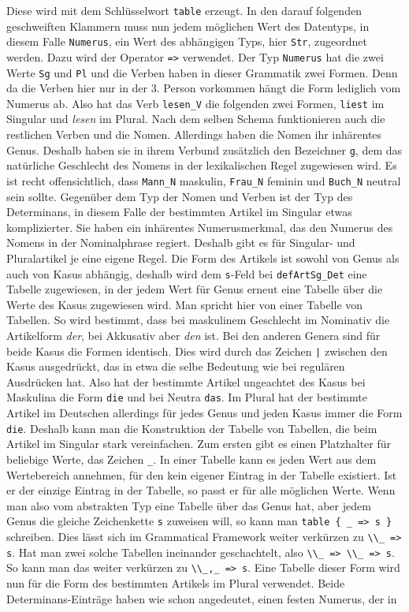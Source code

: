 \documentclass[fontsize=12pt,abstract=on,titlepage,bibliography=totoc,ngerman,listof=totoc]{scrreprt}
\begin{document}
Diese wird mit dem Schlüsselwort \texttt{table} erzeugt. In den darauf folgenden geschweiften Klammern muss nun jedem möglichen Wert des Datentyps, in diesem Falle \texttt{Numerus}, ein Wert des abhängigen Typs, hier \texttt{Str}, zugeordnet werden. Dazu wird der Operator \texttt{=>} verwendet. Der Typ \texttt{Numerus} hat die zwei Werte \texttt{Sg} und \texttt{Pl} und die Verben haben in dieser Grammatik zwei Formen. Denn da die Verben hier nur in der 3. Person vorkommen hängt die Form lediglich vom Numerus ab. Also hat das Verb \texttt{lesen\_V} die folgenden zwei Formen, \texttt{liest} im Singular und \textit{lesen} im Plural. Nach dem selben Schema funktionieren auch die restlichen Verben und die Nomen. Allerdings haben die Nomen ihr inhärentes Genus. Deshalb haben sie in ihrem Verbund zusätzlich den Bezeichner \texttt{g}, dem das natürliche Geschlecht des Nomens in der lexikalischen Regel zugewiesen wird. Es ist recht offensichtlich, dass \texttt{Mann\_N} maskulin, \texttt{Frau\_N} feminin und \texttt{Buch\_N} neutral sein sollte. Gegenüber dem Typ der Nomen und Verben ist der Typ des Determinans, in diesem Falle der bestimmten Artikel im Singular etwas komplizierter. Sie haben ein inhärentes Numerusmerkmal, das den Numerus des Nomens in der Nominalphrase regiert. Deshalb gibt es für Singular- und Pluralartikel je eine eigene Regel. Die Form des Artikels ist sowohl von Genus als auch von Kasus abhängig, deshalb wird dem  \texttt{s}-Feld bei \texttt{defArtSg\_Det} eine Tabelle zugewiesen, in der jedem Wert für Genus erneut eine Tabelle über die Werte des Kasus zugewiesen wird. Man spricht hier von einer Tabelle von Tabellen. So wird bestimmt, dass bei maskulinem Geschlecht im Nominativ die Artikelform \textit{der}, bei Akkusativ aber \textit{den} ist. Bei den anderen Genera sind für beide Kasus die Formen identisch. Dies wird durch das Zeichen \texttt{|} zwischen den Kasus ausgedrückt, das in etwa die selbe Bedeutung wie bei regulären Ausdrücken hat. Also hat der bestimmte Artikel ungeachtet des Kasus bei Maskulina die Form \texttt{die} und bei Neutra \texttt{das}. Im Plural hat der bestimmte Artikel im Deutschen allerdings für jedes Genus und jeden Kasus immer die Form \texttt{die}. Deshalb kann man die Konstruktion der Tabelle von Tabellen, die beim Artikel im Singular stark vereinfachen. Zum ersten gibt es einen Platzhalter für beliebige Werte, das Zeichen \texttt{\_}. In einer Tabelle kann es jeden Wert aus dem Wertebereich annehmen, für den kein eigener Eintrag in der Tabelle existiert. Ist er der einzige Eintrag in der Tabelle, so passt er für alle möglichen Werte. Wenn man also vom abstrakten Typ eine Tabelle über das Genus hat, aber jedem Genus die gleiche Zeichenkette \texttt{s} zuweisen will, so kann man \texttt{table \{ \_ => s \}} schreiben. Dies lässt sich im Grammatical Framework weiter verkürzen zu \texttt{\textbackslash{}\textbackslash{}\_ => s}. Hat man zwei solche Tabellen ineinander geschachtelt, also \texttt{\textbackslash{}\textbackslash{}\_ => \textbackslash{}\textbackslash{}\_ => s}. So kann man das weiter verkürzen zu \texttt{\textbackslash{}\textbackslash{}\_,\_ => s}. Eine Tabelle dieser Form wird nun für die Form des bestimmten Artikels im Plural verwendet. Beide Determinans-Einträge haben wie schon angedeutet, einen festen Numerus, der in 
\end{document}
